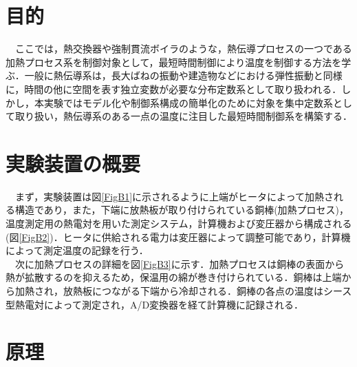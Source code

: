 \documentclass[12pt]{jsarticle}
\begin{document}
\section{目的}
　ここでは，熱交換器や強制貫流ボイラのような，熱伝導プロセスの一つである加熱プロセス系を制御対象として，最短時間制御により温度を制御する方法を学ぶ．一般に熱伝導系は，長大ばねの振動や建造物などにおける弾性振動と同様に，時間の他に空間を表す独立変数が必要な分布定数系として取り扱われる．しかし，本実験ではモデル化や制御系構成の簡単化のために対象を集中定数系として取り扱い，熱伝導系のある一点の温度に注目した最短時間制御系を構築する．
\section{実験装置の概要}
　まず，実験装置は図\ref{FigB1}に示されるように上端がヒータによって加熱される構造であり，また，下端に放熱板が取り付けられている銅棒(加熱プロセス)，温度測定用の熱電対を用いた測定システム，計算機および変圧器から構成される(図\ref{FigB2})．ヒータに供給される電力は変圧器によって調整可能であり，計算機によって測定温度の記録を行う．\\
　次に加熱プロセスの詳細を図\ref{FigB3}に示す．加熱プロセスは銅棒の表面から熱が拡散するのを抑えるため，保温用の綿が巻き付けられている．銅棒は上端から加熱され，放熱板につながる下端から冷却される．銅棒の各点の温度はシース型熱電対によって測定され，A/D変換器を経て計算機に記録される．
\section{原理}
\end{document}
